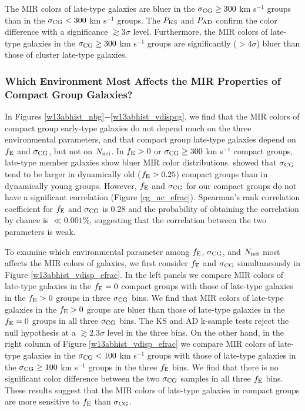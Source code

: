 \documentclass[12pt,preprint,apj]{emulateapj}
\newcommand{\efrac}{f_{\rm E}}
\newcommand{\nbg}{N_{\rm nei}}
\begin{document}
The MIR colors of late-type galaxies are bluer 
in the $\sigma_{\rm CG}\geq300$ km s$^{-1}$ groups 
than in the $\sigma_{\rm CG}<300$ km s$^{-1}$ groups.
The $P_{\rm KS}$ and $P_{\rm AD}$ confirm the color difference with 
a significance $\gtrsim3\sigma$ level. 
Furthermore, the MIR colors of late-type galaxies 
in the $\sigma_{\rm CG}\geq300$ km s$^{-1}$ groups 
are significantly ($>4\sigma$) bluer than those of cluster late-type galaxies.



\subsubsection{Which Environment Most Affects the MIR Properties of 
Compact Group Galaxies?}\label{env_params}

In Figures \ref{w13abhist_nbg}$-$\ref{w13abhist_vdispcg}, 
we find that the MIR colors of compact group early-type galaxies do not depend 
much on the three environmental parameters,
and that compact group late-type galaxies depend on
$\efrac$ and $\sigma_{\rm CG}$, but not on $\nbg$. 
In $\efrac>0$ or $\sigma_{\rm CG}\geq300$ km s$^{-1}$ compact groups, 
late-type member galaxies show bluer MIR color distributions.
\citet{bitsakis+11} showed that $\sigma_{\rm CG}$ tend to be larger in 
dynamically old ($\efrac>0.25$) compact groups than in dynamically young groups.
However, $\efrac$ and $\sigma_{\rm CG}$ for our compact groups do not have 
a significant correlation (Figure \ref{cg_nc_efrac}).
Spearman's rank correlation coefficient for 
$\efrac$ and $\sigma_{\rm CG}$ is 0.28 and the probability of obtaining 
the correlation by chance is $\ll0.001\%$, suggesting that the correlation between 
the two parameters is weak.

To examine which environmental parameter 
among $\efrac$, $\sigma_{\rm CG}$, and $\nbg$
most affects the MIR colors of galaxies, we first consider $\efrac$ and 
$\sigma_{\rm CG}$ simultaneously in Figure \ref{w13abhist_vdisp_efrac}.
In the left panels we compare MIR colors of late-type galaxies 
in the $\efrac=0$ compact groups with those of late-type galaxies 
in the $\efrac>0$ groups in three $\sigma_{\rm CG}$ bins. 
We find that MIR colors of late-type galaxies in the $\efrac>0$ groups 
are bluer than those of late-type galaxies in the $\efrac=0$ groups 
in all three $\sigma_{\rm CG}$ bins. 
The KS and AD k-sample tests reject the null hypothesis at 
a $\gtrsim2.3\sigma$ level in the three bins. 
On the other hand, in the right column of Figure \ref{w13abhist_vdisp_efrac}
we compare MIR colors of late-type galaxies 
in the $\sigma_{\rm CG}<100$ km s$^{-1}$ groups with 
those of late-type galaxies in the $\sigma_{\rm CG}\geq100$ 
km s$^{-1}$ groups in the three $\efrac$ bins. 
We find that there is no significant color difference between
the two $\sigma_{\rm CG}$ samples in all three $\efrac$ bins. 
These results suggest that the MIR colors of late-type galaxies in compact groups 
are more sensitive to $\efrac$ than $\sigma_{\rm CG}$. 
\end{document}
